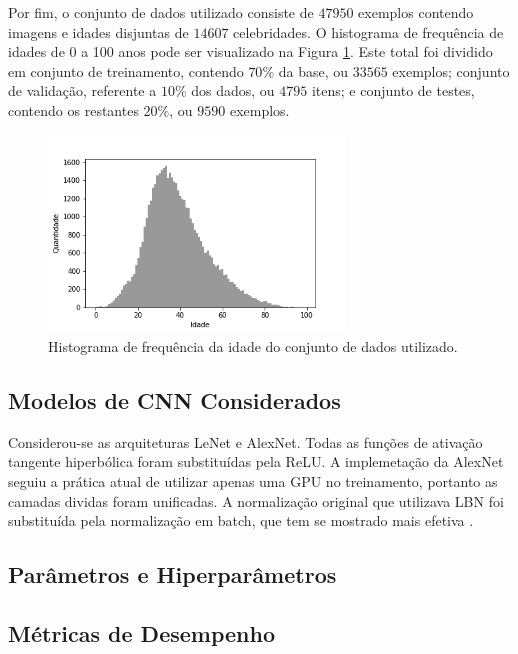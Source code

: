 Por fim, o conjunto de dados utilizado consiste de $47950$ exemplos contendo imagens e idades disjuntas de $14607$ celebridades. O histograma de frequência de idades de 0 a 100 anos pode ser visualizado na Figura \ref{fig:hist}. Este total foi dividido em conjunto de treinamento, contendo $70\%$ da base, ou $33565$ exemplos; conjunto de validação, referente a $10\%$ dos dados, ou $4795$ itens; e conjunto de testes, contendo os restantes $20\%$, ou $9590$ exemplos.

\begin{figure}
     \includegraphics[width=0.7\textwidth]{img/idade_hist_clean}
     \caption{Histograma de frequência da idade do conjunto de dados utilizado.}
     \label{fig:hist}
\end{figure}

\subsection{Modelos de CNN Considerados}
Considerou-se as arquiteturas LeNet e AlexNet. Todas as funções de ativação tangente hiperbólica foram substituídas pela ReLU. A implemetação da AlexNet seguiu a prática atual de utilizar apenas uma GPU no treinamento, portanto as camadas dividas foram unificadas. A normalização original que utilizava LBN foi substituída pela normalização em batch, que tem se mostrado mais efetiva .

\subsection{Parâmetros e Hiperparâmetros}

\subsection{Métricas de Desempenho}

